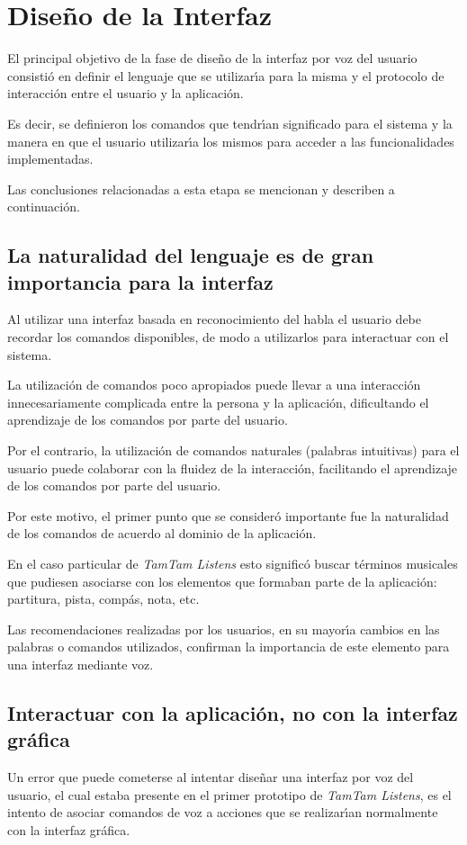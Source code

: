 \section{Dise\~no de la Interfaz}
\label{sec:disenho-interfaz}

El principal objetivo de la fase de dise\~no de la interfaz por voz del usuario consisti\'o
en definir el lenguaje que se utilizar{\'\i}a para la misma y el protocolo de interacci\'on entre
el usuario y la aplicaci\'on.

Es decir, se definieron los comandos que tendr{\'\i}an significado para el sistema y la manera
en que el usuario utilizar{\'\i}a los mismos para acceder a las funcionalidades implementadas.

Las conclusiones relacionadas a esta etapa se mencionan y describen a continuaci\'on.

\subsection{La naturalidad del lenguaje es de gran importancia para la interfaz}
Al utilizar una interfaz basada en reconocimiento del habla el usuario debe recordar los
comandos disponibles, de modo a utilizarlos para interactuar con el sistema.

La utilizaci\'on de comandos poco apropiados puede llevar a una interacci\'on innecesariamente
complicada entre la persona y la aplicaci\'on, dificultando el aprendizaje
de los comandos por parte del usuario.

Por el contrario, la utilizaci\'on de comandos naturales (palabras intuitivas) para el usuario puede colaborar
con la fluidez de la interacci\'on, facilitando el aprendizaje de los comandos por parte del usuario. 

Por este motivo, el primer punto que se consider\'o importante fue la naturalidad de los comandos
de acuerdo al dominio de la aplicaci\'on.

En el caso particular de \emph{TamTam Listens} esto signific\'o buscar t\'erminos musicales
que pudiesen asociarse con los elementos que formaban parte de la aplicaci\'on: partitura,
pista, comp\'as, nota, etc.

Las recomendaciones realizadas por los usuarios, en su mayor{\'\i}a cambios en las palabras o comandos utilizados,
confirman la importancia de este elemento para una interfaz mediante voz.   


\subsection{Interactuar con la aplicaci\'on, no con la interfaz gr\'afica}
Un error que puede cometerse al intentar dise\~nar una interfaz por voz del usuario,
el cual estaba presente en el primer prototipo de \emph{TamTam Listens}, es el intento
de asociar comandos de voz a acciones que se realizar{\'\i}an normalmente con la interfaz
gr\'afica.

